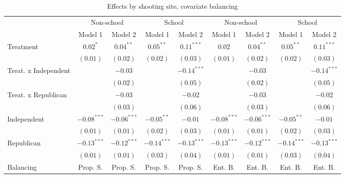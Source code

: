 
\begin{sidewaystable}
\caption{Effects by shooting site, covariate balancing}
\begin{center}
\begin{tabular}{l c c c c c c c c}
\toprule
 & \multicolumn{2}{c}{Non-school} & \multicolumn{2}{c}{School} & \multicolumn{2}{c}{Non-school} & \multicolumn{2}{c}{School} \\
\cmidrule(lr){2-3} \cmidrule(lr){4-5} \cmidrule(lr){6-7} \cmidrule(lr){8-9}
 & Model 1 & Model 2 & Model 1 & Model 2 & Model 1 & Model 2 & Model 1 & Model 2 \\
\midrule
Treatment            & $0.02^{*}$    & $0.04^{**}$   & $0.05^{**}$   & $0.11^{***}$  & $0.02$        & $0.04^{**}$   & $0.05^{**}$   & $0.11^{***}$  \\
                     & $(0.01)$      & $(0.02)$      & $(0.02)$      & $(0.03)$      & $(0.01)$      & $(0.02)$      & $(0.02)$      & $(0.03)$      \\
Treat. x Independent &               & $-0.03$       &               & $-0.14^{***}$ &               & $-0.03$       &               & $-0.14^{***}$ \\
                     &               & $(0.02)$      &               & $(0.05)$      &               & $(0.02)$      &               & $(0.05)$      \\
Treat. x Republican  &               & $-0.03$       &               & $-0.02$       &               & $-0.03$       &               & $-0.02$       \\
                     &               & $(0.03)$      &               & $(0.06)$      &               & $(0.03)$      &               & $(0.06)$      \\
Independent          & $-0.08^{***}$ & $-0.06^{***}$ & $-0.05^{**}$  & $-0.01$       & $-0.08^{***}$ & $-0.06^{***}$ & $-0.05^{**}$  & $-0.01$       \\
                     & $(0.01)$      & $(0.01)$      & $(0.02)$      & $(0.03)$      & $(0.01)$      & $(0.01)$      & $(0.02)$      & $(0.03)$      \\
Republican           & $-0.13^{***}$ & $-0.12^{***}$ & $-0.14^{***}$ & $-0.13^{***}$ & $-0.13^{***}$ & $-0.12^{***}$ & $-0.14^{***}$ & $-0.13^{***}$ \\
                     & $(0.01)$      & $(0.01)$      & $(0.03)$      & $(0.04)$      & $(0.01)$      & $(0.01)$      & $(0.03)$      & $(0.04)$      \\
\midrule
Balancing            & Prop. S.      & Prop. S.      & Prop. S.      & Prop. S.      & Ent. B.       & Ent. B.       & Ent. B.       & Ent. B.       \\

\end{tabular}
\end{center}
\end{sidewaystable}
